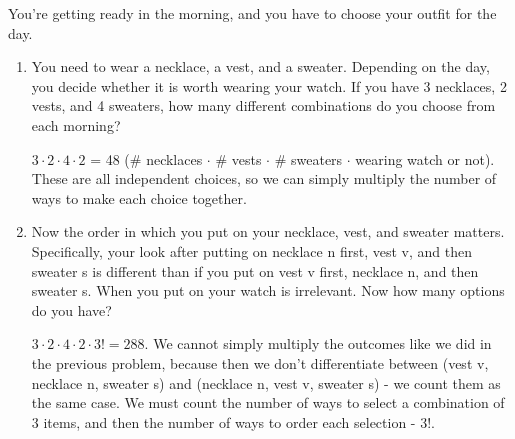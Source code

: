 \question 
\vspace{2 mm}
You're getting ready in the morning, and you have to choose your outfit for the day.
\begin{enumerate}[label=(\alph*)]
\item
You need to wear a necklace, a vest, and a sweater. Depending on the day, you decide whether it is worth wearing your watch. If you have 3 necklaces, 2 vests, and 4 sweaters, how many different combinations do you choose from each morning?

\begin{solution}[.3 in]
$3 \cdot 2 \cdot 4  \cdot 2 $ = 48 (\# necklaces $\cdot$ \# vests  $\cdot$ \# sweaters $\cdot$ wearing watch or not). These are all independent choices, so we can simply multiply the number of ways to make each choice together.
\end{solution}

\item Now the order in which you put on your necklace, vest, and sweater matters. Specifically, your look after putting on necklace n first, vest v, and then sweater s is different than if you put on vest v first, necklace n, and then sweater s. When you put on your watch is irrelevant. Now how many options do you have?

\begin{solution} [0.3 in]
$3 \cdot 2 \cdot 4  \cdot 2 \cdot 3! = 288$. We cannot simply multiply the outcomes like we did in the previous problem, because then we don't differentiate between (vest v, necklace n, sweater s) and (necklace n, vest v, sweater s) - we count them as the same case. We must count the number of ways to select a combination of 3 items, and then the number of ways to order each selection - 3!. 
\end{solution}

\end{enumerate}